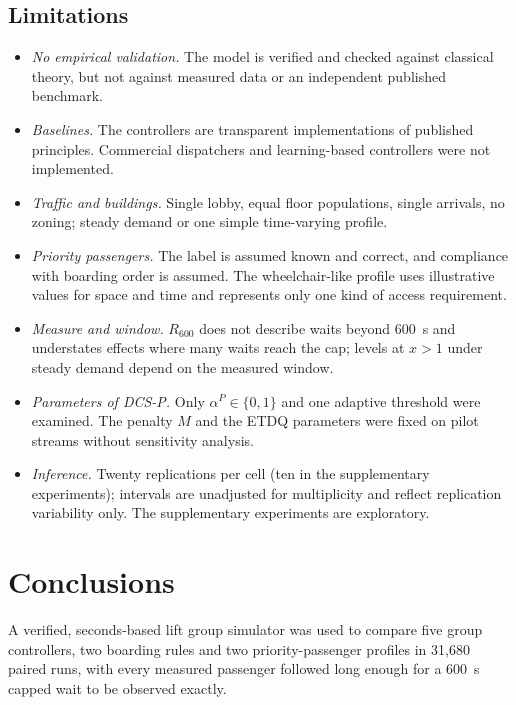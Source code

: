 \documentclass[12pt,a4paper]{article}
\begin{document}
\subsection{Limitations}
\begin{itemize}[itemsep=1pt]
\item \emph{No empirical validation.} The model is verified and checked against classical theory, but not against measured data or an independent published benchmark.
\item \emph{Baselines.} The controllers are transparent implementations of published principles. Commercial dispatchers and learning-based controllers \cite{crites1998,wan2024,wang2021} were not implemented.
\item \emph{Traffic and buildings.} Single lobby, equal floor populations, single arrivals, no zoning; steady demand or one simple time-varying profile.
\item \emph{Priority passengers.} The label is assumed known and correct, and compliance with boarding order is assumed. The wheelchair-like profile uses illustrative values for space and time and represents only one kind of access requirement.
\item \emph{Measure and window.} $R_{600}$ does not describe waits beyond 600~s and understates effects where many waits reach the cap; levels at $x>1$ under steady demand depend on the measured window.
\item \emph{Parameters of DCS-P.} Only $\alpha^{P}\in\{0,1\}$ and one adaptive threshold were examined. The penalty $M$ and the ETDQ parameters were fixed on pilot streams without sensitivity analysis.
\item \emph{Inference.} Twenty replications per cell (ten in the supplementary experiments); intervals are unadjusted for multiplicity and reflect replication variability only. The supplementary experiments are exploratory.
\end{itemize}

\section{Conclusions}\label{sec:conclusions}
A verified, seconds-based lift group simulator was used to compare five group controllers, two boarding rules and two priority-passenger profiles in 31,680 paired runs, with every measured passenger followed long enough for a 600~s capped wait to be observed exactly.
\end{document}
